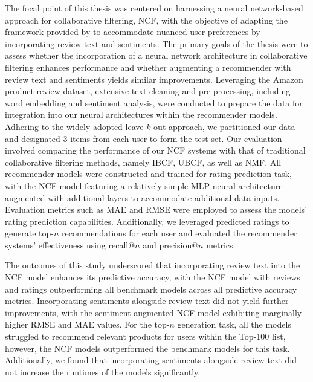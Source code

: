 The focal point of this thesis was centered on harnessing a neural network-based approach for collaborative filtering, NCF, with the objective of adapting the framework provided by \cite{he2017neural} to accommodate nuanced user preferences by incorporating review text and sentiments. The primary goals of the thesis were to assess whether the incorporation of a neural network architecture in collaborative filtering enhances performance and whether augmenting a recommender with review text and sentiments yields similar improvements. Leveraging the Amazon product review dataset, extensive text cleaning and pre-processing, including word embedding and sentiment analysis, were conducted to prepare the data for integration into our neural architectures within the recommender models. Adhering to the widely adopted leave-$k$-out approach, we partitioned our data and designated 3 items from each user to form the test set. Our evaluation involved comparing the performance of our NCF systems with that of traditional collaborative filtering methods, namely IBCF, UBCF, as well as NMF. All recommender models were constructed and trained for rating prediction task, with the NCF model featuring a relatively simple MLP neural architecture augmented with additional layers to accommodate additional data inputs. Evaluation metrics such as MAE and RMSE were employed to assess the models' rating prediction capabilities. Additionally, we leveraged predicted ratings to generate top-$n$ recommendations for each user and evaluated the recommender systems' effectiveness using recall@$n$ and precision@$n$ metrics.

The outcomes of this study underscored that incorporating review text into the NCF model enhances its predictive accuracy, with the NCF model with reviews and ratings outperforming all benchmark models across all predictive accuracy metrics. Incorporating sentiments alongside review text did not yield further improvements, with the sentiment-augmented NCF model exhibiting marginally higher RMSE and MAE values. For the top-$n$ generation task, all the models struggled to recommend relevant products for users within the Top-100 list, however, the NCF models outperformed the benchmark models for this task. Additionally, we found that incorporating sentiments alongside review text did not increase the runtimes of the models significantly. 

